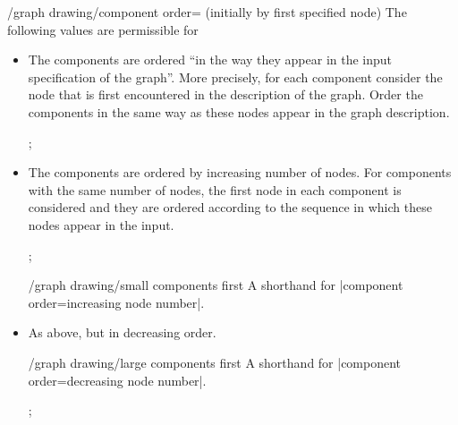 \begin{key}{/graph drawing/component order= (initially
    by first specified node)}
  The following values are permissible for 
  \begin{itemize}
  \item {}

    The components are ordered ``in the way they appear in the input
    specification of the graph''. More precisely, for each component
    consider the node that is first encountered in the description
    of the graph. Order the components in the same way as these nodes
    appear in the graph description.
\begin{codeexample}[]
\tikz {};
\end{codeexample}
  \item {}
    
    The components are ordered by increasing number of nodes. For
    components with the same number of nodes, the first node in each
    component is considered and they are ordered according to the
    sequence in which these nodes appear in the input.
\begin{codeexample}[]
\tikz {};
\end{codeexample}
    \begin{key}{/graph drawing/small components first}
      A shorthand for |component order=increasing node number|.
    \end{key}
  \item {}
    As above, but in decreasing order.  
    \begin{key}{/graph drawing/large components first}
      A shorthand for |component order=decreasing node number|.
\begin{codeexample}[]
\tikz {};
\end{codeexample}
    \end{key}
  \end{itemize}
\end{key}


